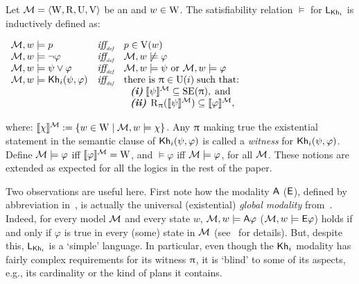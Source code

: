 \begin{definition}\label{def:sem-esm}
Let $\mathcal{M}=\langle \operatorname{W},\operatorname{R},\operatorname{U},\operatorname{V} \rangle$ be an \ults and $w \in \operatorname{W}$.
The satisfiability relation $\models$ for $\mathsf{L}_{{\sf Kh}_i}$ is inductively defined as:
\begin{spcenter}
$\begin{array}{l@{\ \ \ }c@{\ \ \  }l}
\modults, w \models p & \iffdef & p \in \V(w) \\
\modults, w \models \neg\varphi & \iffdef & \modults, w \not\models \varphi \\
\modults, w \models \psi\vee\varphi & \iffdef & \modults, w \models \psi \mbox{ or }\modults, w \models \varphi \\
\modults, w \models \khi(\psi,\varphi) & \iffdef & \text{there is } \plans \in \Unc(i) \;\text{such that:} \\
& & \ \ \text{\bfseries \itshape (i)} \; \truthset{\modults}{\psi} \subseteq \stexec(\plans),\; \text{and} \\
& & \ \ \text{\bfseries \itshape (ii)} \; \R_\plans(\truthset{\modults}{\psi}) \subseteq \truthset{\modults}{\varphi},
\end{array}$
\end{spcenter}
where: $\llbracket \chi \rrbracket^{\mathcal{M}} := \{ w\in\operatorname{W} \mid \mathcal{M},w\models\chi \}$. Any $\uppi$ making true the existential statement in the semantic clause of ${\sf Kh}_i(\psi,\varphi)$ is called a \emph{witness} for ${\sf Kh}_i(\psi,\varphi)$. Define $\mathcal{M}\models\varphi$ iff  $\llbracket \varphi \rrbracket^{\mathcal{M}}=\operatorname{W}$, and $\models\varphi$ iff $\mathcal{M}\models\varphi$, for all \ults $\mathcal{M}$. These notions are extended as expected for all the logics in the rest of the paper.
\end{definition}

\medskip

Two observations are useful here. First note how the modality ${\sf A}$ (${\sf E}$), defined by abbreviation in~, is actually the universal (existential) \emph{global modality} from~\cite{GorankoP92}. Indeed, for every model $\mathcal{M}$ and every state $w$, $\mathcal{M},w\models{\sf A}\varphi$ ($\mathcal{M},w\models{\sf E}\varphi$) holds if and only if $\varphi$ is true in every (some) state in $\mathcal{M}$ (see~\cite{AFSVQ21,AFSVQ23report} for details). %
But, despite this, $\mathsf{L}_{{\sf Kh}_i}$ is a `simple' language. In particular, even though the ${\sf Kh}_i$ modality has fairly complex requirements for its witness $\uppi$, it is `blind' to some of its aspects, e.g., its cardinality or the kind of plans it contains.

